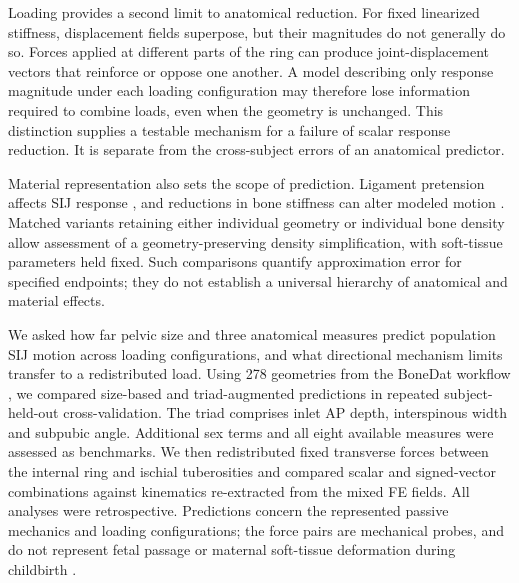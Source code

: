 Loading provides a second limit to anatomical reduction. For fixed linearized stiffness, displacement fields superpose, but their magnitudes do not generally do so. Forces applied at different parts of the ring can produce joint-displacement vectors that reinforce or oppose one another. A model describing only response magnitude under each loading configuration may therefore lose information required to combine loads, even when the geometry is unchanged. This distinction supplies a testable mechanism for a failure of scalar response reduction. It is separate from the cross-subject errors of an anatomical predictor.

Material representation also sets the scope of prediction. Ligament pretension affects SIJ response \citep{Heyland2025}, and reductions in bone stiffness can alter modeled motion \citep{Fan2026}. Matched variants retaining either individual geometry or individual bone density allow assessment of a geometry-preserving density simplification, with soft-tissue parameters held fixed. Such comparisons quantify approximation error for specified endpoints; they do not establish a universal hierarchy of anatomical and material effects.

We asked how far pelvic size and three anatomical measures predict population SIJ motion across loading configurations, and what directional mechanism limits transfer to a redistributed load. Using 278 geometries from the BoneDat workflow \citep{HenyssKuchar2025BoneDat}, we compared size-based and triad-augmented predictions in repeated subject-held-out cross-validation. The triad comprises inlet AP depth, interspinous width and subpubic angle. Additional sex terms and all eight available measures were assessed as benchmarks. We then redistributed fixed transverse forces between the internal ring and ischial tuberosities and compared scalar and signed-vector combinations against kinematics re-extracted from the mixed FE fields. All analyses were retrospective. Predictions concern the represented passive mechanics and loading configurations; the force pairs are mechanical probes, and do not represent fetal passage or maternal soft-tissue deformation during childbirth \citep{ChenGrimm2021}.
